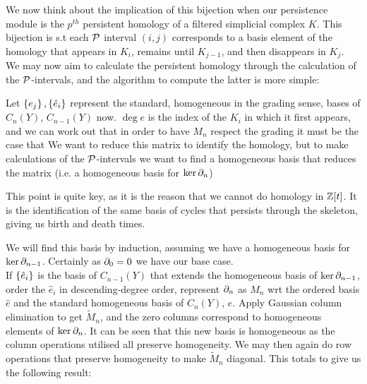 \documentclass{article}
\begin{document}
We now think about the implication of this bijection when our persistence module is the $p^{th}$ persistent homology of a filtered simplicial complex $K$. This bijection is s.t each $\mathcal{P}$ interval $(i,j)$ corresponds to a basis element of the homology that appears in $K_i$, remains until $K_{j-1}$, and then disappears in $K_{j}$. \\
We may now aim to calculate the persistent homology through the calculation of the $\mathcal{P}$-intervals, and the algorithm to compute the latter is more simple: 
\vspace{3mm}

Let $\left\{ e_j \right\}, \left\{ \hat{e}_i \right\}$ represent the standard, homogeneous in the grading sense, bases of $C_n(Y), \, C_{n-1}(Y)$ now. $\deg e$ is the index of the $K_i$ in which it first appears, and we can work out that in order to have $M_n$ respect the grading it must be the case that 
We want to reduce this matrix to identify the homology, but to make calculations of the $\mathcal{P}$-intervals we want to find a homogeneous basis that reduces the matrix (i.e. a homogeneous basis for $\ker \partial_n$)
\begin{remark}
	This point is quite key, as it is the reason that we cannot do  homology in $\mathbb{Z}[t]$. It is the identification of the same basis of cycles that persists through the skeleton, giving us birth and death times. 
\end{remark}
We will find this basis by induction, assuming we have a homogeneous basis for $\ker \partial_{n-1}$. Certainly as $\partial_0=0$ we have our base case. \\
If $\left\{ \hat{e}_i \right\}$ is the basis of $C_{n-1}(Y)$ that extends the homogeneous basis of $\ker \partial_{n-1}$, order the $\hat{e}_i$ in descending-degree order, represent $\partial_n$ as $M_n$ wrt the ordered basis $\hat{e}$ and the standard homogeneous basis of $C_n(Y)$, $e$. Apply Gaussian column elimination to get $\tilde{M}_n$, and the zero columns correspond to homogeneous elements of $\ker \partial_{n}$. It can be seen that this new basis is homogeneous as the column operations utilised all preserve homogeneity. We may then again do row operations that preserve homogeneity to make $\tilde{M}_n$ diagonal. This totals to give us the following result:
\end{document}
